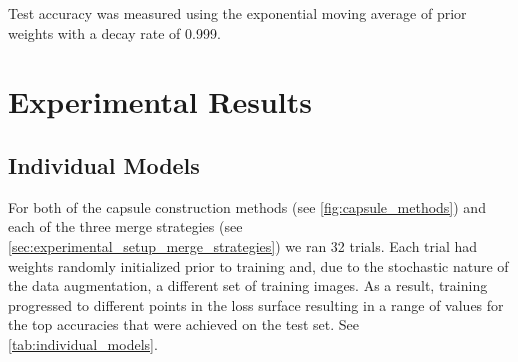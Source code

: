 \documentclass{article}
\begin{document}
Test accuracy was measured using the exponential moving average of prior weights with a decay rate of 0.999.~\cite{Izmailov2018}

\section{Experimental Results}\label{sec:experimental_results}

\subsection{Individual Models}

For both of the capsule construction methods (see \autoref{fig:capsule_methods}) and each of the three merge strategies (see \autoref{sec:experimental_setup_merge_strategies}) we ran 32 trials.  Each trial had weights randomly initialized prior to training and, due to the stochastic nature of the data augmentation, a different set of training images.  As a result, training progressed to different points in the loss surface resulting in a range of values for the top accuracies that were achieved on the test set.  See \autoref{tab:individual_models}.
\end{document}
